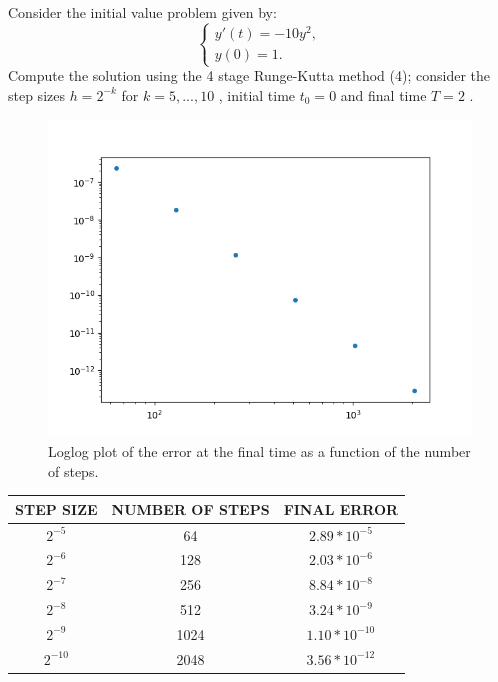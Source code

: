 \documentclass[a4paper,12pt]{article}
\begin{document}
Consider the initial value problem given by:
\begin{equation}
\begin{cases}
y'(t) = -10y^2 , \\
y(0) = 1.
\end{cases}
\end{equation}
Compute the solution using the 4 stage Runge-Kutta method (4); consider the step sizes $h = 2^{-k}$ for $k = 5,...,10$ , initial time $t_0 = 0$ and final time $T = 2$ .


\begin{figure}[H]
\centering
    \includegraphics[width=\textwidth]{rk4_error.png} %
    \caption{Loglog plot of the error at the final time as a function of the number of steps.}
    \label{fig:rk4_error}
\end{figure}


\begin{tabular}{|c|c|c}
    \hline
    STEP SIZE & NUMBER OF STEPS & FINAL ERROR \\ \hline
    $2^{-5}$ & 64 & $2.89*10^{-5}$  \\ \hline
    $2^{-6}$ & 128 & $2.03*10^{-6}$  \\ \hline
    $2^{-7}$ & 256 & $8.84*10^{-8}$  \\ \hline
    $2^{-8}$ & 512 & $3.24*10^{-9}$  \\ \hline
    $2^{-9}$ & 1024 & $1.10*10^{-10}$ \\ \hline
    $2^{-10}$ & 2048 & $3.56*10^{-12}$  \\ \hline
    \hline
\end{tabular}
\\[5pt]
\end{document}
